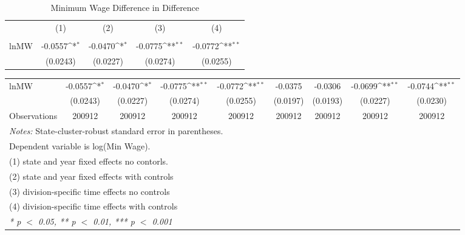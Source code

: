 \begin{table}[htbp]\centering
\def\sym#1{\ifmmode^{#1}\else\(^{#1}\)\fi}
\caption{Minimum Wage Difference in Difference\label{auto}}
\begin{tabular}{l*{4}{c}}
\hline\hline
                    &\multicolumn{1}{c}{(1)}&\multicolumn{1}{c}{(2)}&\multicolumn{1}{c}{(3)}&\multicolumn{1}{c}{(4)}\\
                    &\multicolumn{1}{c}{ }&\multicolumn{1}{c}{ }&\multicolumn{1}{c}{ }&\multicolumn{1}{c}{ }\\
\hline
lnMW                &     -0.0557\sym{*}  &     -0.0470\sym{*}  &     -0.0775\sym{**} &     -0.0772\sym{**} \\
                    &    (0.0243)         &    (0.0227)         &    (0.0274)         &    (0.0255)         \\
\hline\hline
\end{tabular}
\end{table}
{
\def\sym#1{\ifmmode^{#1}\else\(^{#1}\)\fi}
\begin{tabular}{l*{8}{c}}
\hline\hline
\hline
lnMW                &     -0.0557\sym{*}  &     -0.0470\sym{*}  &     -0.0775\sym{**} &     -0.0772\sym{**} &     -0.0375         &     -0.0306         &     -0.0699\sym{**} &     -0.0744\sym{**} \\
                    &    (0.0243)         &    (0.0227)         &    (0.0274)         &    (0.0255)         &    (0.0197)         &    (0.0193)         &    (0.0227)         &    (0.0230)         \\
\hline
Observations        &      200912         &      200912         &      200912         &      200912         &      200912         &      200912         &      200912         &      200912         \\
\hline\hline
\multicolumn{9}{l}{\footnotesize \textit{Notes:} State-cluster-robust standard error in parentheses.}\\
\multicolumn{9}{l}{\footnotesize Dependent variable is log(Min Wage).}\\
\multicolumn{9}{l}{\footnotesize (1) state and year fixed effects no contorls.}\\
\multicolumn{9}{l}{\footnotesize (2) state and year fixed effects with controls}\\
\multicolumn{9}{l}{\footnotesize (3) division-specific time effects no controls}\\
\multicolumn{9}{l}{\footnotesize (4) division-specific time effects with controls}\\
\multicolumn{9}{l}{\footnotesize \textit{* p $<$ 0.05, ** p $<$ 0.01, *** p $<$ 0.001}}\\
\end{tabular}
}
